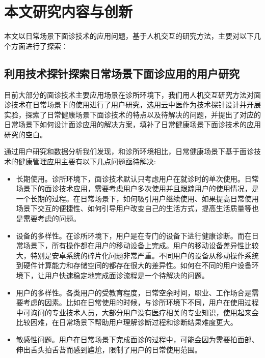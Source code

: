 
\section{本文研究内容与创新}

本文以日常场景下面诊技术的应用问题，基于人机交互的研究方法，主要对以下几个方面进行了探索：

\subsection{利用技术探针探索日常场景下面诊应用的用户研究}

目前大部分的面诊技术主要应用场景在诊所环境下，我们用人机交互研究方法对面诊技术在日常场景下的使用进行了用户研究，选用云中医作为技术探针设计并开展实验，探索了日常健康场景下面诊技术的特点以及待解决的问题，并提出了对应的日常场景下如何设计面诊应用的解决方案，填补了日常健康场景下面诊技术的应用研究的空白\cite{ding2019reading}。

通过用户研究和数据分析我们发现，和诊所环境相比，日常健康场景下基于面诊技术的健康管理应用主要有以下几点问题亟待解决: 

\begin{itemize}
    
    \item 长期使用。诊所环境下，面诊技术默认只考虑用户在就诊时的单次使用。日常场景下的面诊技术应用，需要考虑用户多次使用并且跟踪用户的使用情况，是一个长期的过程。在日常场景下，如何吸引用户继续使用、如果提高日常使用场景下交互的便捷性、如何引导用户改变自己的生活方式，提高生活质量等也是需要考虑的问题。

    \item 设备的多样性。在诊所环境下，用户是在专门的设备下进行健康诊断。而在日常场景下，所有操作都在用户的移动设备上完成。用户的移动设备差异性比较大，特别是安卓系统的碎片化问题非常严重。不同用户的设备从移动操作系统到硬件计算能力和存储空间的都存在很大的差异性。如何在不同的用户设备环境下，让用户快速稳定地完成面诊流程是一个待解决的问题。
    
    \item 用户的多样性。各类用户的受教育程度，日常空余时间，职业、工作场合是需要考虑的因素。比如在日常使用的时候，与诊所环境下不同，用户在使用过程中可询问的专业技术人员，大部分用户没有医疗相关的专业知识，使用起来会比较困难，在日常场景下帮助用户理解诊断过程和诊断结果难度更大。
    
    \item 敏感性问题。用户在日常场景下完成面诊的过程中，可能会因为需要拍面部、伸出舌头拍舌苔而感到尴尬，限制了用户的日常使用范围。

\end{itemize}

